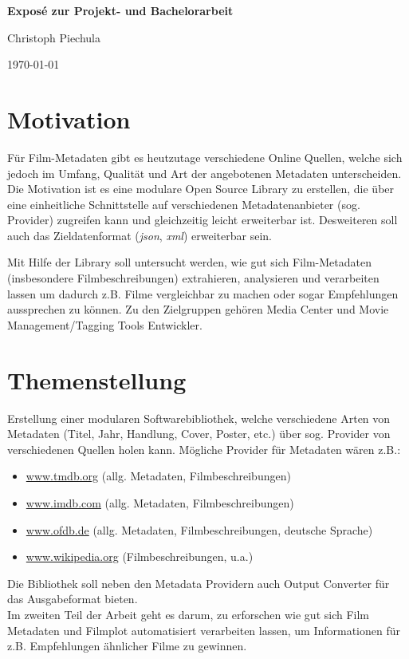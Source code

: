 \documentclass[8pt,a4paper,ngerman]{scrartcl}
\begin{document}
\thispagestyle{empty}
\begin{center}
    \LARGE{\textbf{Exposé zur Projekt- und Bachelorarbeit}}
\end{center}
\begin{center}
    \large{Christoph Piechula}
\end{center}
\begin{center}
    \small{\today}
\end{center}

\section{Motivation}
Für Film-Metadaten gibt es heutzutage verschiedene Online Quellen, welche sich
jedoch im Umfang, Qualität und Art der angebotenen Metadaten unterscheiden.
Die Motivation ist es eine modulare Open Source Library zu erstellen, die über
eine einheitliche Schnittstelle auf verschiedenen Metadatenanbieter (sog.
Provider) zugreifen kann und gleichzeitig leicht erweiterbar ist.  Desweiteren
soll auch das Zieldatenformat (\textit{json}, \textit{xml}) erweiterbar sein. 

Mit Hilfe der Library soll untersucht werden, wie gut sich Film-Metadaten
(insbesondere Filmbeschreibungen) extrahieren, analysieren und verarbeiten
lassen um dadurch z.B. Filme vergleichbar zu machen oder sogar Empfehlungen
aussprechen zu können. Zu den Zielgruppen gehören Media Center und Movie
Management/Tagging Tools Entwickler.

\section{Themenstellung}
Erstellung einer modularen Softwarebibliothek, welche verschiedene Arten von
Metadaten (Titel, Jahr, Handlung, Cover, Poster, etc.) über sog.  Provider von
verschiedenen Quellen holen kann. Mögliche Provider für Metadaten wären z.B.:
\begin{itemize}
    \item \url{www.tmdb.org} (allg. Metadaten, Filmbeschreibungen)
    \item \url{www.imdb.com} (allg. Metadaten, Filmbeschreibungen)
    \item \url{www.ofdb.de} (allg. Metadaten, Filmbeschreibungen, deutsche Sprache)
    \item \url{www.wikipedia.org} (Filmbeschreibungen, u.a.)
\end{itemize}
Die Bibliothek soll neben den Metadata Providern auch Output Converter für das
Ausgabeformat bieten. 
\\
Im zweiten Teil der Arbeit geht es darum, zu erforschen wie gut sich Film
Metadaten und Filmplot automatisiert verarbeiten lassen, um Informationen für z.B.
Empfehlungen ähnlicher Filme zu gewinnen. 
\end{document}
